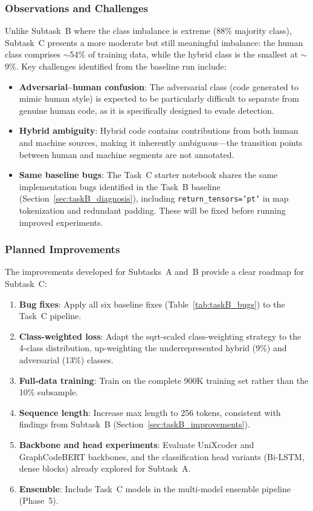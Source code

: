 \documentclass[11pt]{article}
\begin{document}
\subsubsection{Observations and Challenges}

Unlike Subtask~B where the class imbalance is extreme (88\% majority class), Subtask~C presents a more moderate but still meaningful imbalance: the human class comprises $\sim$54\% of training data, while the hybrid class is the smallest at $\sim$9\%. Key challenges identified from the baseline run include:

\begin{itemize}
    \item \textbf{Adversarial--human confusion}: The adversarial class (code generated to mimic human style) is expected to be particularly difficult to separate from genuine human code, as it is specifically designed to evade detection.
    \item \textbf{Hybrid ambiguity}: Hybrid code contains contributions from both human and machine sources, making it inherently ambiguous---the transition points between human and machine segments are not annotated.
    \item \textbf{Same baseline bugs}: The Task~C starter notebook shares the same implementation bugs identified in the Task~B baseline (Section~\ref{sec:taskB_diagnosis}), including \texttt{return\_tensors='pt'} in map tokenization and redundant padding. These will be fixed before running improved experiments.
\end{itemize}

\subsubsection{Planned Improvements}

The improvements developed for Subtasks~A and~B provide a clear roadmap for Subtask~C:
\begin{enumerate}
    \item \textbf{Bug fixes}: Apply all six baseline fixes (Table~\ref{tab:taskB_bugs}) to the Task~C pipeline.
    \item \textbf{Class-weighted loss}: Adapt the sqrt-scaled class-weighting strategy to the 4-class distribution, up-weighting the underrepresented hybrid (9\%) and adversarial (13\%) classes.
    \item \textbf{Full-data training}: Train on the complete 900K training set rather than the 10\% subsample.
    \item \textbf{Sequence length}: Increase max length to 256 tokens, consistent with findings from Subtask~B (Section~\ref{sec:taskB_improvements}).
    \item \textbf{Backbone and head experiments}: Evaluate UniXcoder and GraphCodeBERT backbones, and the classification head variants (Bi-LSTM, dense blocks) already explored for Subtask~A.
    \item \textbf{Ensemble}: Include Task~C models in the multi-model ensemble pipeline (Phase~5).
\end{enumerate}
\end{document}
